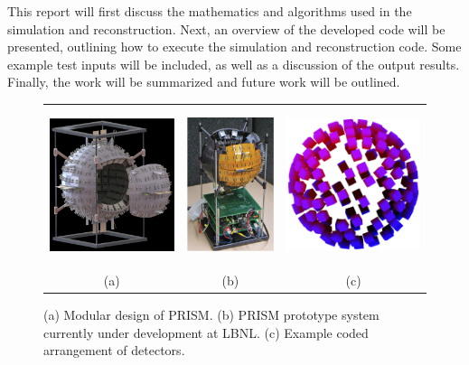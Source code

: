 \documentclass[10pt]{article}
\begin{document}
This report will first discuss the mathematics and algorithms used in the simulation and reconstruction. Next, an overview of the developed code will be presented, outlining how to execute the simulation and reconstruction code. Some example test inputs will be included, as well as a discussion of the output results. Finally, the work will be summarized and future work will be outlined. 


\begin{figure}[htb]
\hypertarget{fig1}{}
\centering
\begin{tabular}{ccc}
	\includegraphics[height=130pt]{Figures/PRISM_Design.png} & 
	\includegraphics[height=130pt]{Figures/PRISM_Prototype.png} & 
	\includegraphics[height=130pt]{Figures/Masked_Configuration.png} \\
	\scriptsize{(a)} & \scriptsize{(b)} & \scriptsize{(c)} \\[-6pt]
\end{tabular}
\caption{(a) Modular design of PRISM. (b) PRISM prototype system currently under development at LBNL. (c) Example coded arrangement of detectors.}
\end{figure}
\end{document}
